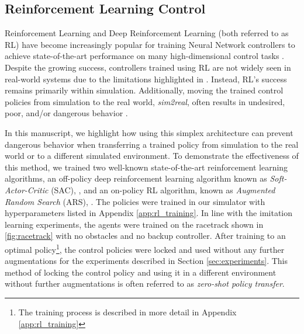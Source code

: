 \documentclass[manuscript,screen,review]{acmart}
\begin{document}
\subsection{Reinforcement Learning Control}
Reinforcement Learning and Deep Reinforcement Learning (both referred to as RL) have become increasingly popular for training Neural Network controllers to achieve state-of-the-art performance on many high-dimensional control tasks \cite{lillicrap2015continuous, schulman2015trust, schulman2017proximal, mania2018simple, haarnoja2018soft}. Despite the growing success, controllers trained using RL are not widely seen in real-world systems due to the limitations highlighted in \cite{dulac2019challenges}. Instead, RL's success remains primarily within simulation. Additionally, moving the trained control policies from simulation to the real world, \emph{sim2real}, often results in undesired, poor, and/or dangerous behavior \cite{jang2019ICCPS, kadian2019we}.

In this manuscript, we highlight how using this simplex architecture can prevent dangerous behavior when transferring a trained policy from simulation to the real world or to a different simulated environment.
To demonstrate the effectiveness of this method, we trained  two well-known state-of-the-art reinforcement learning algorithms, an off-policy deep reinforcement learning algorithm known as \emph{Soft-Actor-Critic} (SAC), \cite{haarnoja2018soft}, and an on-policy RL algorithm, known as \emph{Augmented Random Search} (ARS), \cite{mania2018simple}. The policies were trained in our simulator with hyperparameters listed in Appendix \ref{app:rl_training}. In line with the imitation learning experiments, the agents were trained on the racetrack shown in \ref{fig:racetrack} with no obstacles and no backup controller. After training to an optimal policy\footnote{The training process is described in more detail in Appendix \ref{app:rl_training}}, the control policies were locked and used without any further augmentations for the experiments described in Section \ref{sec:experiments}. This method of locking the control policy and using it in a different environment without further augmentations is often referred to as \emph{zero-shot policy transfer}.

\end{document}
